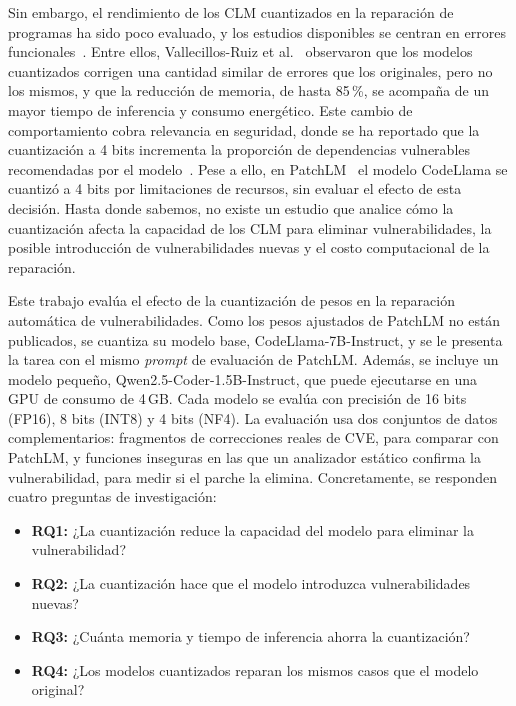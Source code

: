 \documentclass[conference]{IEEEtran}
\begin{document}
Sin embargo, el rendimiento de los CLM cuantizados en la reparación de programas ha sido poco evaluado, y los estudios disponibles se centran en errores funcionales~\cite{vallecillos2026smaller,kusama2025small}. Entre ellos, Vallecillos-Ruiz et al.~\cite{vallecillos2026smaller} observaron que los modelos cuantizados corrigen una cantidad similar de errores que los originales, pero no los mismos, y que la reducción de memoria, de hasta 85\,\%, se acompaña de un mayor tiempo de inferencia y consumo energético. Este cambio de comportamiento cobra relevancia en seguridad, donde se ha reportado que la cuantización a 4 bits incrementa la proporción de dependencias vulnerables recomendadas por el modelo~\cite{haque2025secure}. %
Pese a ello, en PatchLM~\cite{bhandari2025patchlm} el modelo CodeLlama se cuantizó a 4 bits por limitaciones de recursos, sin evaluar el efecto de esta decisión. Hasta donde sabemos, no existe un estudio que analice cómo la cuantización afecta la capacidad de los CLM para eliminar vulnerabilidades, la posible introducción de vulnerabilidades nuevas y el costo computacional de la reparación.

Este trabajo evalúa el efecto de la cuantización de pesos en la reparación automática de vulnerabilidades. Como los pesos ajustados de PatchLM no están publicados, se cuantiza su modelo base, CodeLlama-7B-Instruct, y se le presenta la tarea con el mismo \emph{prompt} de evaluación de PatchLM. Además, se incluye un modelo pequeño, Qwen2.5-Coder-1.5B-Instruct, que puede ejecutarse en una GPU de consumo de 4\,GB. Cada modelo se evalúa con precisión de 16 bits (FP16), 8 bits (INT8) y 4 bits (NF4). La evaluación usa dos conjuntos de datos complementarios: fragmentos de correcciones reales de CVE, para comparar con PatchLM, y funciones inseguras en las que un analizador estático confirma la vulnerabilidad, para medir si el parche la elimina. Concretamente, se responden cuatro preguntas de investigación:

\begin{itemize}
\item \textbf{RQ1:} ¿La cuantización reduce la capacidad del modelo para eliminar la vulnerabilidad?
\item \textbf{RQ2:} ¿La cuantización hace que el modelo introduzca vulnerabilidades nuevas?
\item \textbf{RQ3:} ¿Cuánta memoria y tiempo de inferencia ahorra la cuantización?
\item \textbf{RQ4:} ¿Los modelos cuantizados reparan los mismos casos que el modelo original?
\end{itemize}
\end{document}
